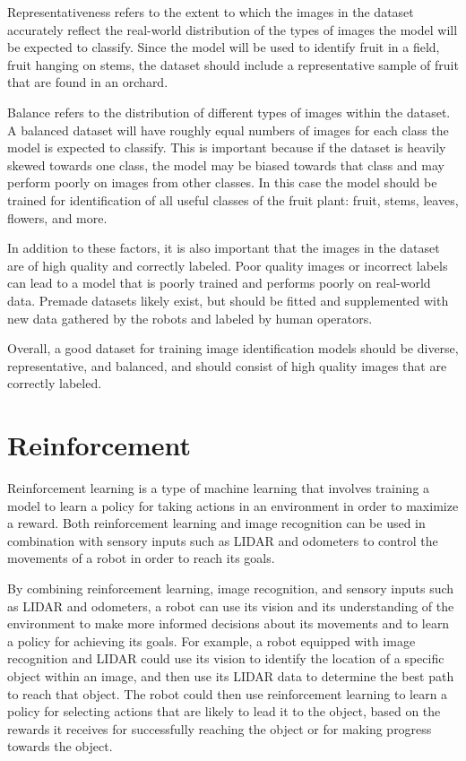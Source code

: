 \documentclass[%
oneside,    %
project,    %
nosummary   %
]{USN-MSc}
\begin{document}
Representativeness refers to the extent to which the images in the dataset accurately reflect the real-world distribution of the types of images the model will be expected to classify. Since the model will be used to identify fruit in a field, fruit hanging on stems, the dataset should include a representative sample of fruit that are found in an orchard.

Balance refers to the distribution of different types of images within the dataset. A balanced dataset will have roughly equal numbers of images for each class the model is expected to classify. This is important because if the dataset is heavily skewed towards one class, the model may be biased towards that class and may perform poorly on images from other classes. In this case the model should be trained for identification of all useful classes of the fruit plant: fruit, stems, leaves, flowers, and more.

In addition to these factors, it is also important that the images in the dataset are of high quality and correctly labeled. Poor quality images or incorrect labels can lead to a model that is poorly trained and performs poorly on real-world data. Premade datasets likely exist, but should be fitted and supplemented with new data gathered by the robots and labeled by human operators.

Overall, a good dataset for training image identification models should be diverse, representative, and balanced, and should consist of high quality images that are correctly labeled.

\section{Reinforcement}
Reinforcement learning is a type of machine learning that involves training a model to learn a policy for taking actions in an environment in order to maximize a reward. Both reinforcement learning and image recognition can be used in combination with sensory inputs such as LIDAR and odometers to control the movements of a robot in order to reach its goals.

By combining reinforcement learning, image recognition, and sensory inputs such as LIDAR and odometers, a robot can use its vision and its understanding of the environment to make more informed decisions about its movements and to learn a policy for achieving its goals. For example, a robot equipped with image recognition and LIDAR could use its vision to identify the location of a specific object within an image, and then use its LIDAR data to determine the best path to reach that object. The robot could then use reinforcement learning to learn a policy for selecting actions that are likely to lead it to the object, based on the rewards it receives for successfully reaching the object or for making progress towards the object.
\end{document}
